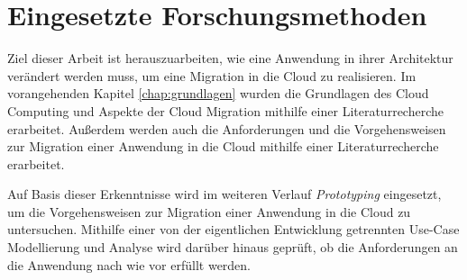\chapter{Eingesetzte Forschungsmethoden}
Ziel dieser Arbeit ist herauszuarbeiten, wie eine Anwendung in ihrer Architektur verändert werden muss, um eine Migration in die Cloud zu realisieren. Im vorangehenden Kapitel \ref{chap:grundlagen} wurden die Grundlagen des Cloud Computing und Aspekte der Cloud Migration mithilfe einer Literaturrecherche erarbeitet. Außerdem werden auch die Anforderungen und die Vorgehensweisen zur Migration einer Anwendung in die Cloud mithilfe einer Literaturrecherche erarbeitet.

Auf Basis dieser Erkenntnisse wird im weiteren Verlauf \textit{Prototyping} eingesetzt, um die Vorgehensweisen zur Migration einer Anwendung in die Cloud zu untersuchen. Mithilfe einer von der eigentlichen Entwicklung getrennten Use-Case Modellierung und Analyse wird darüber hinaus geprüft, ob die Anforderungen an die Anwendung nach wie vor erfüllt werden.




